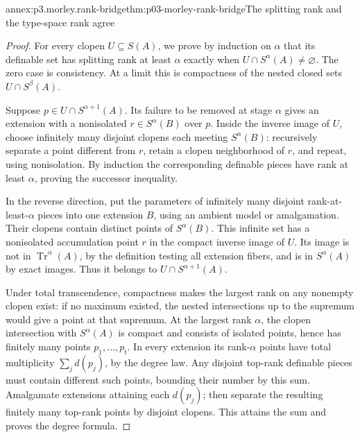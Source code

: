 \begin{annexitem}{annex:p3.morley.rank-bridge}{thm:p03-morley-rank-bridge}{The splitting rank and the type-space rank agree}
\begin{proof}
For every clopen \(U\subseteq S(A)\), we prove by induction
on \(\alpha\) that its definable set has splitting rank at
least \(\alpha\) exactly when \(U\cap S^\alpha(A)\ne\varnothing\).
The zero case is consistency. At a limit this is compactness
of the nested closed sets \(U\cap S^\beta(A)\).

Suppose \(p\in U\cap S^{\alpha+1}(A)\). Its failure to be
removed at stage \(\alpha\) gives an extension with a
nonisolated \(r\in S^\alpha(B)\) over \(p\). Inside the
inverse image of \(U\), choose infinitely many disjoint
clopens each meeting \(S^\alpha(B)\): recursively separate
a point different from \(r\), retain a clopen neighborhood
of \(r\), and repeat, using nonisolation. By induction the
corresponding definable pieces have rank at least
\(\alpha\), proving the successor inequality.

In the reverse direction, put the parameters of infinitely
many disjoint rank-at-least-\(\alpha\) pieces into one
extension \(B\), using an ambient model or amalgamation.
Their clopens contain distinct points of
\(S^\alpha(B)\). This infinite set has a nonisolated
accumulation point \(r\) in the compact inverse image of
\(U\). Its image is not in \(\operatorname{Tr}^\alpha(A)\),
by the definition testing all extension fibers, and is in
\(S^\alpha(A)\) by exact images. Thus it belongs to
\(U\cap S^{\alpha+1}(A)\).

Under total transcendence, compactness makes the largest
rank on any nonempty clopen exist: if no maximum existed,
the nested intersections up to the supremum would give a
point at that supremum. At the largest rank \(\alpha\),
the clopen intersection with \(S^\alpha(A)\) is compact
and consists of isolated points, hence has finitely many
points \(p_1,\ldots,p_t\). In every extension its
rank-\(\alpha\) points have total multiplicity
\(\sum_jd(p_j)\), by the degree law. Any disjoint
top-rank definable pieces must contain different such
points, bounding their number by this sum. Amalgamate
extensions attaining each \(d(p_j)\); then separate
the resulting finitely many top-rank points by disjoint
clopens. This attains the sum and proves the degree formula.


\end{proof}
\end{annexitem}
